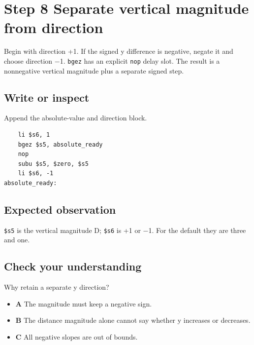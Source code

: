 \section{Step 8 Separate vertical magnitude from
  direction}\label{007-bresenham-line-s08-step-8-separate-vertical-magnitude-from-direction}

Begin with direction +1. If the signed y difference is negative, negate
it and choose direction \ensuremath{-}1. \texttt{bgez} has an explicit \texttt{nop}
delay slot. The result is a nonnegative vertical magnitude plus a
separate signed step.

\subsection{Write or
  inspect}\label{007-bresenham-line-s08-write-or-inspect}

Append the absolute-value and direction block.

\begin{verbatim}
    li $s6, 1
    bgez $s5, absolute_ready
    nop
    subu $s5, $zero, $s5
    li $s6, -1
absolute_ready:
\end{verbatim}

\subsection{Expected
  observation}\label{007-bresenham-line-s08-expected-observation}

\texttt{\$s5} is the vertical magnitude D; \texttt{\$s6} is +1 or \ensuremath{-}1.
For the default they are three and one.

\subsection{Check your
  understanding}\label{007-bresenham-line-s08-check-your-understanding}

Why retain a separate y direction?

\begin{itemize}
  \tightlist
  \item
        \textbf{A} The magnitude must keep a negative sign.
  \item
        \textbf{B} The distance magnitude alone cannot say whether y increases
        or decreases.
  \item
        \textbf{C} All negative slopes are out of bounds.
\end{itemize}

